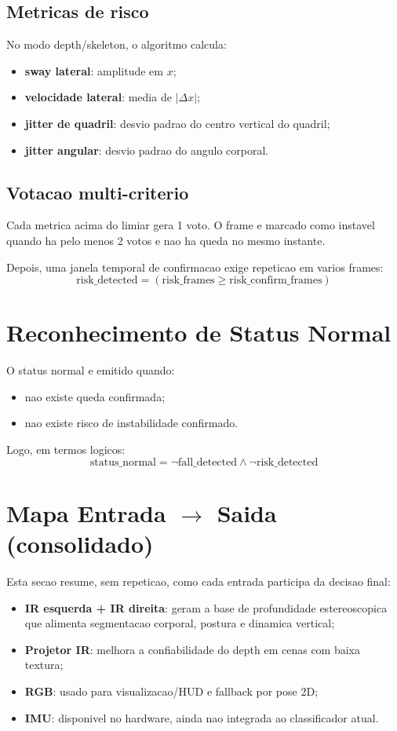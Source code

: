 \documentclass[12pt,a4paper]{article}
\begin{document}
\subsection{Metricas de risco}
No modo depth/skeleton, o algoritmo calcula:
\begin{itemize}
    \item \textbf{sway lateral}: amplitude em $x$;
    \item \textbf{velocidade lateral}: media de $|\Delta x|$;
    \item \textbf{jitter de quadril}: desvio padrao do centro vertical do quadril;
    \item \textbf{jitter angular}: desvio padrao do angulo corporal.
\end{itemize}

\subsection{Votacao multi-criterio}
Cada metrica acima do limiar gera 1 voto. O frame e marcado como instavel quando ha pelo menos 2 votos e nao ha queda no mesmo instante.

Depois, uma janela temporal de confirmacao exige repeticao em varios frames:
\[
\text{risk\_detected} = (\text{risk\_frames} \geq \text{risk\_confirm\_frames})
\]

\section{Reconhecimento de Status Normal}
O status normal e emitido quando:
\begin{itemize}
    \item nao existe queda confirmada;
    \item nao existe risco de instabilidade confirmado.
\end{itemize}

Logo, em termos logicos:
\[
\text{status\_normal} = \neg\text{fall\_detected} \land \neg\text{risk\_detected}
\]

\section{Mapa Entrada $\rightarrow$ Saida (consolidado)}
Esta secao resume, sem repeticao, como cada entrada participa da decisao final:
\begin{itemize}
    \item \textbf{IR esquerda + IR direita}: geram a base de profundidade estereoscopica que alimenta segmentacao corporal, postura e dinamica vertical;
    \item \textbf{Projetor IR}: melhora a confiabilidade do depth em cenas com baixa textura;
    \item \textbf{RGB}: usado para visualizacao/HUD e fallback por pose 2D;
    \item \textbf{IMU}: disponivel no hardware, ainda nao integrada ao classificador atual.
\end{itemize}
\end{document}
